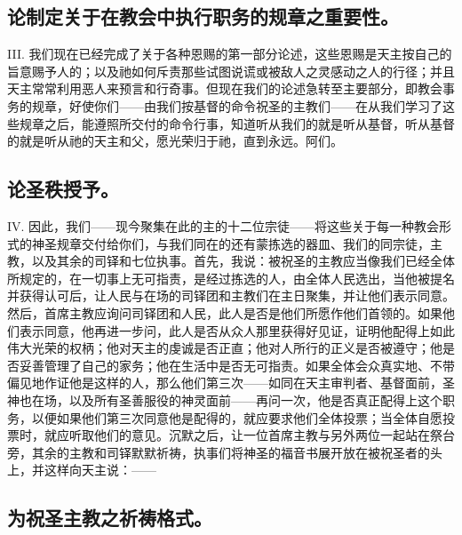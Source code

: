 \subsection{论制定关于在教会中执行职务的规章之重要性。}

III. 我们现在已经完成了关于各种恩赐的第一部分论述，这些恩赐是天主按自己的旨意赐予人的；以及祂如何斥责那些试图说谎或被敌人之灵感动之人的行径；并且天主常常利用恶人来预言和行奇事。但现在我们的论述急转至主要部分，即教会事务的规章，好使你们——由我们按基督的命令祝圣的主教们——在从我们学习了这些规章之后，能遵照所交付的命令行事，知道听从我们的就是听从基督，听从基督的就是听从祂的天主和父，愿光荣归于祂，直到永远。阿们。\par


\subsection{论圣秩授予。}

IV. 因此，我们——现今聚集在此的主的十二位宗徒——将这些关于每一种教会形式的神圣规章交付给你们，与我们同在的还有蒙拣选的器皿、我们的同宗徒，主教，以及其余的司铎和七位执事。首先，我说：被祝圣的主教应当像我们已经全体所规定的，在一切事上无可指责，是经过拣选的人，由全体人民选出，当他被提名并获得认可后，让人民与在场的司铎团和主教们在主日聚集，并让他们表示同意。然后，首席主教应询问司铎团和人民，此人是否是他们所愿作他们首领的。如果他们表示同意，他再进一步问，此人是否从众人那里获得好见证，证明他配得上如此伟大光荣的权柄；他对天主的虔诚是否正直；他对人所行的正义是否被遵守；他是否妥善管理了自己的家务；他在生活中是否无可指责。如果全体会众真实地、不带偏见地作证他是这样的人，那么他们第三次——如同在天主审判者、基督面前，圣神也在场，以及所有圣善服役的神灵面前——再问一次，他是否真正配得上这个职务，以便如果他们第三次同意他是配得的，就应要求他们全体投票；当全体自愿投票时，就应听取他们的意见。沉默之后，让一位首席主教与另外两位一起站在祭台旁，其余的主教和司铎默默祈祷，执事们将神圣的福音书展开放在被祝圣者的头上，并这样向天主说：——\par


\subsection{为祝圣主教之祈祷格式。}

